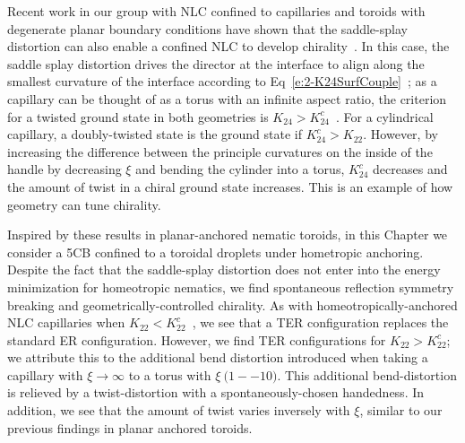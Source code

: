 Recent work in our group with NLC confined to capillaries and toroids with degenerate planar boundary conditions have shown that the saddle-splay distortion can also enable a confined NLC to develop chirality~\cite{RN46,RN59,RN293}.
In this case, the saddle splay distortion drives the director at the interface to align along the smallest curvature of the interface according to Eq~\ref{e:2-K24SurfCouple}~\cite{RN59}; as a capillary can be thought of as a torus with an infinite aspect ratio, the criterion for a twisted ground state in both geometries is $K_{24} > K^c_{24}$~\cite{RN24,RN293}.
For a cylindrical capillary, a doubly-twisted state is the ground state if $K^c_{24}>K_{22}$.
However, by increasing the difference between the principle curvatures on the inside of the handle by decreasing $\xi$ and bending the cylinder into a torus, $K^c_{24}$ decreases and the amount of twist in a chiral ground state increases.
This is an example of how geometry can tune chirality.

Inspired by these results in planar-anchored nematic toroids, in this Chapter we consider a 5CB confined to a toroidal droplets under hometropic anchoring.
Despite the fact that the saddle-splay distortion does not enter into the energy minimization for homeotropic nematics, we find spontaneous reflection symmetry breaking and geometrically-controlled chirality.
As with homeotropically-anchored NLC capillaries when $K_{22} < K^c_{22}$~\cite{RN192}, we see that a TER configuration replaces the standard ER configuration.
However, we find TER configurations for $K_{22} > K^c_{22}$; we attribute this to the additional bend distortion introduced when taking a capillary with $\xi \rightarrow \infty$ to a torus with $\xi ~\mathcal(1--10)$.
This additional bend-distortion is relieved by a twist-distortion with a spontaneously-chosen handedness.
In addition, we see that the amount of twist varies inversely with $\xi$, similar to our previous findings in planar anchored toroids.




